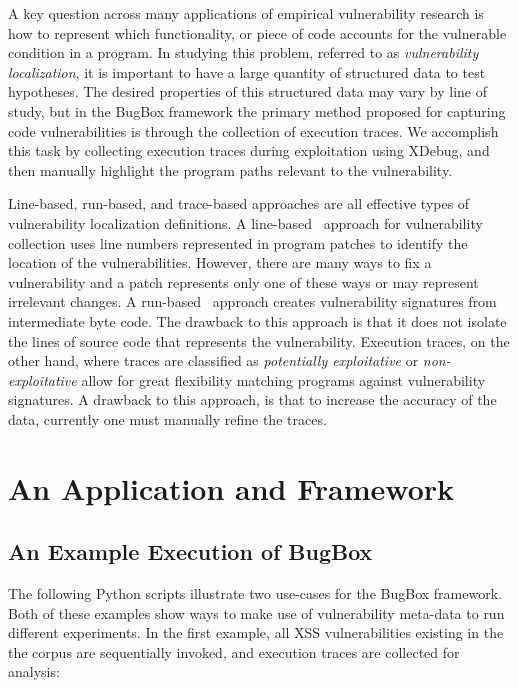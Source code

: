 \documentclass[letterpaper,twocolumn,10pt]{article}
\begin{document}
A key question across many applications of empirical vulnerability research is how to represent which functionality, or piece of code accounts for the vulnerable condition in a program. In studying this problem, referred to as \emph{vulnerability localization}, it is important to have a large quantity of structured data to test hypotheses. The desired properties of this structured data may vary by line of study, but in the BugBox framework the primary method proposed for capturing code vulnerabilities is through the collection of execution traces. We accomplish this task by collecting execution traces during exploitation using XDebug, and then manually highlight the program paths relevant to the vulnerability.\par 
Line-based, run-based, and trace-based approaches are all effective types of vulnerability localization definitions. A line-based~\cite{4630094} approach for vulnerability collection uses line numbers represented in program patches to identify the location of the vulnerabilities.  However, there are many ways to fix a vulnerability and a patch represents only one of these ways or may represent irrelevant changes.  A run-based~\cite{Song:2008:BNA:1496255.1496257} approach creates vulnerability signatures from intermediate byte code. The drawback to this approach is that it does not isolate the lines of source code that represents the vulnerability. Execution traces, on the other hand, where traces are classified as \emph{potentially exploitative} or \emph{non-exploitative} allow for great flexibility matching programs against vulnerability signatures. A drawback to this approach, is that to increase the accuracy of the data, currently one must manually refine the traces.   \par


\section {An Application and Framework}

\subsection {An Example Execution of BugBox}

The following Python scripts illustrate two use-cases for the BugBox framework. Both of these examples show ways to make use of vulnerability meta-data to run different experiments. In the first example, all XSS vulnerabilities existing in the the corpus are sequentially invoked, and execution traces are collected for analysis:
\end{document}
